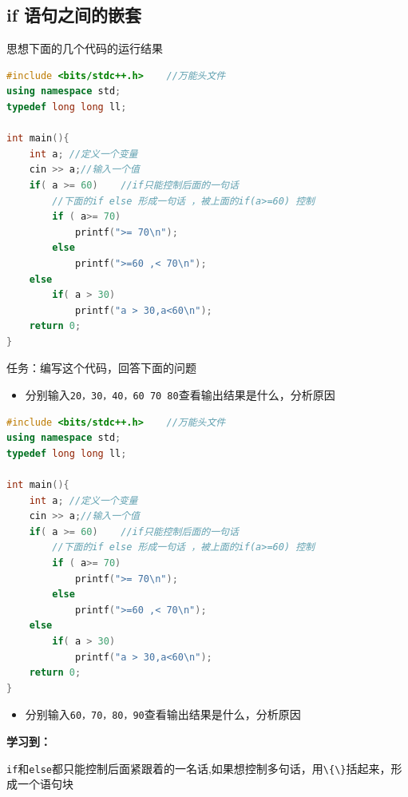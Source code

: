 \documentclass[
  paper=a4,
  ,captions=tableheading
]{scrbook}
\newcommand{\passthrough}[1]{#1}
\providecommand{\tightlist}{%
  \setlength{\itemsep}{0pt}\setlength{\parskip}{0pt}}
\begin{document}
\hypertarget{if-ux8bedux53e5ux4e4bux95f4ux7684ux5d4cux5957}{%
\subsection{if
语句之间的嵌套}\label{if-ux8bedux53e5ux4e4bux95f4ux7684ux5d4cux5957}}

思想下面的几个代码的运行结果

\begin{lstlisting}[language={C++}]
#include <bits/stdc++.h>    //万能头文件
using namespace std;
typedef long long ll;

int main(){
    int a; //定义一个变量
    cin >> a;//输入一个值
    if( a >= 60)    //if只能控制后面的一句话
        //下面的if else 形成一句话 ，被上面的if(a>=60) 控制
        if ( a>= 70)
            printf(">= 70\n");
        else
            printf(">=60 ,< 70\n");
    else
        if( a > 30)
            printf("a > 30,a<60\n");
    return 0;
}
\end{lstlisting}

任务：编写这个代码，回答下面的问题

\begin{itemize}
\tightlist
\item
  分别输入\passthrough{\lstinline!20，30，40，60 70 80!}查看输出结果是什么，分析原因
\end{itemize}

\begin{lstlisting}[language={C++}]
#include <bits/stdc++.h>    //万能头文件
using namespace std;
typedef long long ll;

int main(){
    int a; //定义一个变量
    cin >> a;//输入一个值
    if( a >= 60)    //if只能控制后面的一句话
        //下面的if else 形成一句话 ，被上面的if(a>=60) 控制
        if ( a>= 70)
            printf(">= 70\n");
        else
            printf(">=60 ,< 70\n");
    else
        if( a > 30)
            printf("a > 30,a<60\n");
    return 0;
}
\end{lstlisting}

\begin{itemize}
\tightlist
\item
  分别输入\passthrough{\lstinline!60，70，80，90!}查看输出结果是什么，分析原因
\end{itemize}

\textbf{学习到：}

\passthrough{\lstinline!if!}和\passthrough{\lstinline!else!}都只能控制后面紧跟着的一名话,如果想控制多句话，用\passthrough{\lstinline!\{\}!}括起来，形成一个语句块
\end{document}
